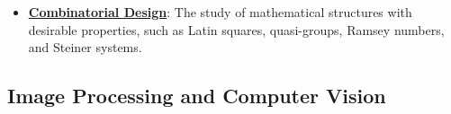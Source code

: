 \documentclass{article}%
\begin{document}
\begin{itemize}[leftmargin=*]
\item \href{https://purdue.brightspace.com/d2l/common/assets/pdfjs-d2l-dist/1.0.14-legacy/web/viewer.html?file=\%2Fcontent\%2Fenforced\%2F1095467-wl.202510.CS.24300.001\%2F13L1-Logic.pdf\%3Fou\%3D1095467\&lang=en-us\&container=d2l-fileviewer-rendered-pdf\&fullscreen=d2l-fileviewer-rendered-pdf-dialog\&height=667#page=22}{\textbf{Combinatorial Design}}: The study of mathematical structures with desirable properties, such as Latin squares, quasi-groups, Ramsey numbers, and Steiner systems.%
\end{itemize}

%
\subsection{Image Processing and Computer Vision}%
\label{subsec:ImageProcessingandComputerVision}%
\end{document}
